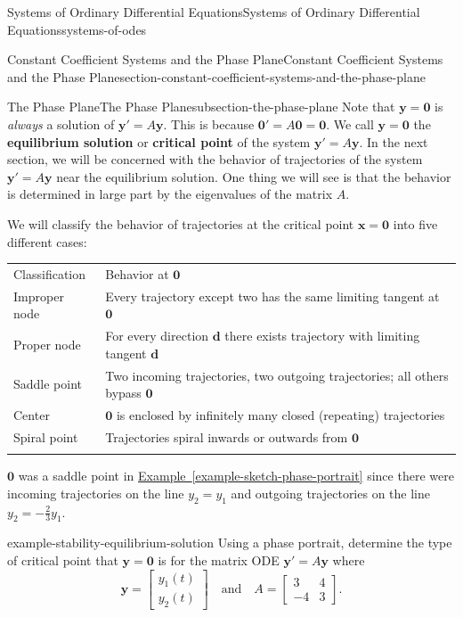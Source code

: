 \documentclass[oneside,10pt,]{book}
\newcommand{\terminology}[1]{\textbf{#1}}
\numberwithin{equation}{section}
\newcommand{\hrulethick} {\noalign{\hrule height 0.11em}}
\renewcommand{\vec}[1]{\mathbf{#1}}
\newcommand{\amp}{&}
\begin{document}
\begin{chapterptx}{Systems of Ordinary Differential Equations}{}{Systems of Ordinary Differential Equations}{}{}{systems-of-odes}
\begin{sectionptx}{Constant Coefficient Systems and the Phase Plane}{}{Constant Coefficient Systems and the Phase Plane}{}{}{section-constant-coefficient-systems-and-the-phase-plane}
\begin{subsectionptx}{The Phase Plane}{}{The Phase Plane}{}{}{subsection-the-phase-plane}
Note that \(\vec{y}=\vec{0}\) is \emph{always} a solution of \(\vec{y}'=A\vec{y}\). This is because \(\vec{0}'=A\vec{0} = \vec{0}\). We call \(\vec{y} = \vec{0}\) the \terminology{equilibrium solution} or \terminology{critical point} of the system \(\vec{y}'=A\vec{y}\). In the next section, we will be concerned with the behavior of trajectories of the system \(\vec{y}'=A\vec{y}\) near the equilibrium solution. One thing we will see is that the behavior is determined in large part by the eigenvalues of the matrix \(A\).%
\par
\hypertarget{p-376}{}%
We will classify the behavior of trajectories at the critical point \(\vec{x} = \vec{0}\) into five different cases:%
\begin{table}
\centering
\begin{tabular}{ll}\hrulethick
Classification&Behavior at \(\vec{0}\)\tabularnewline\hrulethick
Improper node&Every trajectory except two has the same limiting tangent at \(\vec{0}\)\tabularnewline[0pt]
Proper node&For every direction \(\vec{d}\) there exists trajectory with limiting tangent \(\vec{d}\)\tabularnewline[0pt]
Saddle point&Two incoming trajectories, two outgoing trajectories; all others bypass \(\vec{0}\)\tabularnewline[0pt]
Center&\(\vec{0}\) is enclosed by infinitely many closed (repeating) trajectories\tabularnewline[0pt]
Spiral point&Trajectories spiral inwards or outwards from \(\vec{0}\)\tabularnewline\hrulethick
\end{tabular}
\end{table}
\hypertarget{p-377}{}%
\(\vec{0}\) was a saddle point in \hyperref[example-sketch-phase-portrait]{Example~\ref{example-sketch-phase-portrait}} since there were incoming trajectories on the line \(y_{2} = y_{1}\) and outgoing trajectories on the line \(y_{2} = -\frac{2}{3}y_{1}\).%
\begin{example}{}{example-stability-equilibrium-solution}%
\hypertarget{p-378}{}%
Using a phase portrait, determine the type of critical point that \(\vec{y} = \vec{0}\) is for the matrix ODE \(\vec{y}'=A\vec{y}\) where%
\begin{equation*}
\vec{y} = \begin{bmatrix}y_{1}(t) \\ y_{2}(t)\end{bmatrix}\quad\text{and}\quad A = \begin{bmatrix}3 \amp  4 \\ -4 \amp  3\end{bmatrix}.
\end{equation*}
%
\par\smallskip%

\end{example}
\end{subsectionptx}
\end{sectionptx}
\end{chapterptx}
\end{document}

